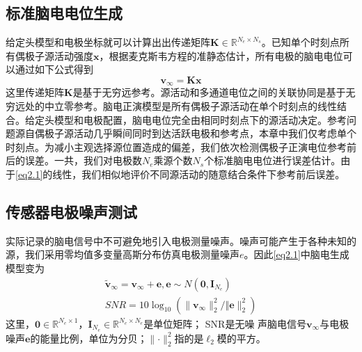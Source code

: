 \subsection{标准脑电电位生成}
给定头模型和电极坐标就可以计算出出传递矩阵$\mathbf{K}\in{\mathbb{R}^{N_e\times{N_s}}}$。已知单个时刻点所有偶极子源活动强度$\mathbf{x}$，根据麦克斯韦方程的准静态估计，所有电极的脑电电位可以通过如下公式得到
\begin{equation}\label{eq2.1}
\mathbf{v}_{\infty}=\mathbf{Kx}
\end{equation}
这里传递矩阵$\mathbf{K}$是基于无穷远参考。源活动和多通道电位之间的关联协同是基于无穷远处的中立零参考。脑电正演模型是所有偶极子源活动在单个时刻点的线性结合。给定头模型和电极配置，脑电电位完全由相同时刻点下的源活动决定。参考问题源自偶极子源活动几乎瞬间同时到达活跃电极和参考点，本章中我们仅考虑单个时刻点。为减小主观选择源位置造成的偏差，我们依次检测偶极子正演电位参考前后的误差。一共，我们对电极数$N_e$乘源个数$N_s$个标准脑电电位进行误差估计。由于\eqref{eq2.1}的线性，我们相似地评价不同源活动的随意结合条件下参考前后误差。
\subsection{传感器电极噪声测试}
实际记录的脑电信号中不可避免地引入电极测量噪声。噪声可能产生于各种未知的源，我们采用零均值多变量高斯分布仿真电极测量噪声$e$。因此\eqref{eq2.1}中脑电生成模型变为
\begin{equation}\label{eq2.2}
\begin{aligned}
\tilde{\mathbf{v}}_\infty=\mathbf{v}_{\infty}+\mathbf{e},\mathbf{e}\sim{N(\mathbf{0},\mathbf{I}_{N_e})}\\
SNR=10\log_{10}(\lVert{\mathbf{v}_\infty}\rVert_2^2/\Vert{\mathbf{e}}\rVert_2^2)
\end{aligned}
\end{equation}
这里，$\mathbf{0}\in{\mathbb{R}^{N_e\times1}}$，$\mathbf{I}_{N_e}\in{\mathbb{R}^{N_e\times{N_e}}}$是单位矩阵； SNR是无噪
声脑电信号$\mathbf{v}_{\infty}$与电极噪声$\mathbf{e}$的能量比例，单位为分贝；$\lVert{\cdot}\rVert_2^2$指的是$\ell_2$模的平方。
